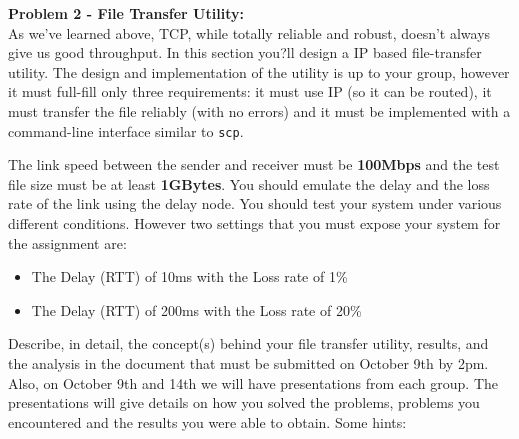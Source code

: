 \documentclass[10pt]{article}
\newcommand{\Problem}[1]{\noindent \textbf{\textbf{Problem #1:  \\ }}}
\begin{document}
\newpage


\Problem{2 - File Transfer Utility}
As we've learned above, TCP, while totally reliable and robust, doesn't always give us good throughput. In this section you?ll design a IP based file-transfer utility. The design and implementation of the utility is up to your group, however it must full-fill only three requirements: it must use IP (so it can be routed), it must transfer the file reliably (with no errors) and it must be implemented with a command-line interface similar to \texttt{scp}.

The link speed between the sender and receiver must be \textbf{100Mbps} and the test file size must be at least \textbf{1GBytes}. You should emulate the delay and the loss rate of the link using the delay node. You should test your system under various different conditions. However two settings that you must expose your system for the assignment are:
\begin{itemize}
\itemsep0em
\item The Delay (RTT) of 10ms with the Loss rate of 1\%
\item The Delay (RTT) of 200ms with the Loss rate of 20\%
\end{itemize}
Describe, in detail, the concept(s) behind your file transfer utility, results, and the analysis in the document that must be submitted on October 9th by 2pm. Also, on October 9th and 14th we will have presentations from each group. The presentations will give details on how you solved the problems, problems you encountered and the results you were able to obtain. Some hints:
\end{document}
